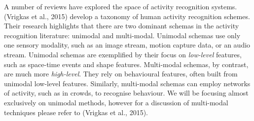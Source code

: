 A number of reviews have explored the space of activity recognition systems. (Vrigkas et al., 2015) develop a taxonomy of human activity recognition schemes. Their research highlights that there are two dominant schemas in the activity recognition literature: unimodal and multi-modal. Unimodal schemas use only one sensory modality, such as an image stream, motion capture data, or an audio stream. Unimodal schemas are exemplified by their focus on \textit{low-level} features, such as space-time events and shape features. Multi-modal schemas, by contrast, are much more \textit{high-level}. They rely on behavioural features, often built from unimodal low-level features. Similarly, multi-modal schemas can employ networks of activity, such as in crowds, to recognise behaviour. We will be focusing almost exclusively on unimodal methods, however for a discussion of multi-modal techniques please refer to (Vrigkas et al., 2015). \\

